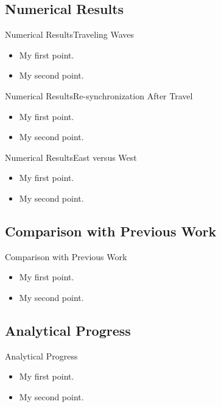 \documentclass{beamer}
\begin{document}
\subsection{Numerical Results}

\begin{frame}{Numerical Results}{Traveling Waves}
	\begin{itemize}
		\item {
			My first point.
		}
		\item {
			My second point.
		}
	\end{itemize}
\end{frame}

\begin{frame}{Numerical Results}{Re-synchronization After Travel}
	\begin{itemize}
		\item {
			My first point.
		}
		\item {
			My second point.
		}
	\end{itemize}
\end{frame}

\begin{frame}{Numerical Results}{East versus West}
	\begin{itemize}
		\item {
			My first point.
		}
		\item {
			My second point.
		}
	\end{itemize}
\end{frame}

\subsection{Comparison with Previous Work}

\begin{frame}{Comparison with Previous Work}
	\begin{itemize}
		\item {
			My first point.
		}
		\item {
			My second point.
		}
	\end{itemize}
\end{frame}

\subsection{Analytical Progress}

\begin{frame}{Analytical Progress}
	\begin{itemize}
		\item {
			My first point.
		}
		\item {
			My second point.
		}
	\end{itemize}
\end{frame}
\end{document}
